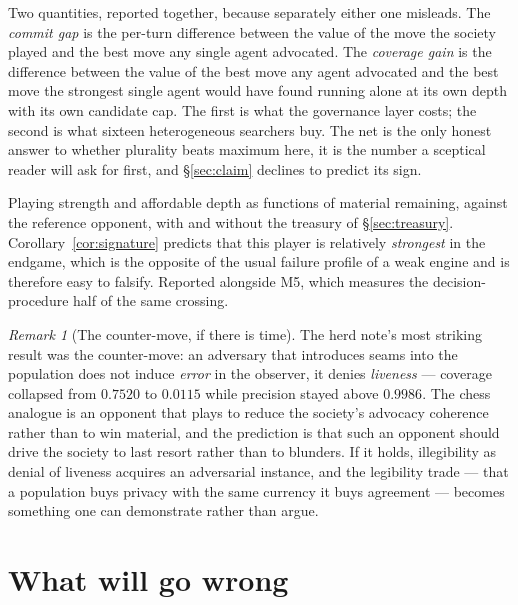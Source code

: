 \documentclass[11pt,a4paper]{article}
\theoremstyle{plain}
\theoremstyle{definition}
\theoremstyle{remark}
\newtheorem{remark}[theorem]{Remark}
\begin{document}
\begin{description}[leftmargin=2.4em,style=nextline]
\item[M10 --- aggregation, netted against coverage.] Two quantities, reported
together, because separately either one misleads. The \emph{commit gap} is the
per-turn difference between the value of the move the society played and the
best move any single agent advocated. The \emph{coverage gain} is the
difference between the value of the best move any agent advocated and the best
move the strongest single agent would have found running alone at its own depth
with its own candidate cap. The first is what the governance layer costs; the
second is what sixteen heterogeneous searchers buy. The net is the only honest
answer to whether plurality beats maximum here, it is the number a sceptical
reader will ask for first, and \S\ref{sec:claim} declines to predict its sign.

\item[M11 --- the endgame signature.] Playing strength and affordable depth as
functions of material remaining, against the reference opponent, with and
without the treasury of \S\ref{sec:treasury}. Corollary~\ref{cor:signature}
predicts that this player is relatively \emph{strongest} in the endgame, which
is the opposite of the usual failure profile of a weak engine and is therefore
easy to falsify. Reported alongside M5, which measures the decision-procedure
half of the same crossing.
\end{description}

\begin{remark}[The counter-move, if there is time]
\label{rem:counter}
The herd note's most striking result was the counter-move: an adversary that
introduces seams into the population does not induce \emph{error} in the
observer, it denies \emph{liveness} --- coverage collapsed from $0.7520$ to
$0.0115$ while precision stayed above $0.9986$. The chess analogue is an
opponent that plays to reduce the society's advocacy coherence rather than to
win material, and the prediction is that such an opponent should drive the
society to last resort rather than to blunders. If it holds, illegibility as
denial of liveness acquires an adversarial instance, and the legibility trade
--- that a population buys privacy with the same currency it buys agreement ---
becomes something one can demonstrate rather than argue.
\end{remark}

\section{What will go wrong}
\label{sec:risks}
\end{document}
